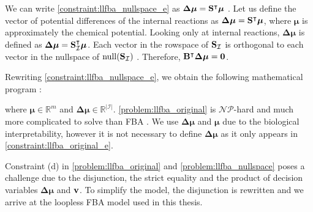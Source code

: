 We can write \cref{constraint:llfba_nullspace_e} as $\boldsymbol{\Delta \mu} = \bold S ^\intercal \boldsymbol \mu$ \cite{noor_proof_2012, elimination_infeasible_loops, muller_fast_2013}. Let us define the vector of potential differences of the internal reactions as $\boldsymbol{\Delta \mu} = \bold S ^\intercal \boldsymbol \mu$, where $\boldsymbol \mu$ is approximately the chemical potential. Looking only at internal reactions, $\boldsymbol{\Delta \mu}$ is defined as $\boldsymbol{\Delta \mu} = \bold S_\mathcal{I}^\intercal \boldsymbol \mu$.  
Each vector in the rowspace of $\bold S_{\mathcal{I}}$ is orthogonal to each vector in the nullspace of $\mathrm{null}(\bold S_{\mathcal{I}})$ \cite{noor_proof_2012}.
Therefore, $\bold B^\intercal \boldsymbol{\Delta \mu} = \bold 0$. 

Rewriting \cref{constraint:llfba_nullspace_e}, we obtain the following mathematical program \cite{muller_fast_2013}:
where $\boldsymbol \mu \in \mathbb{R}^m$ and $\boldsymbol{\Delta \mu} \in \mathbb{R}^{|\mathcal{I}|}$. 
\cref{problem:llfba_original} is $\mathcal{NP}$-hard and much more complicated to solve than \textsf{FBA} \cite{cornelis_metabolic_nodate}. We use $\boldsymbol{\Delta \mu}$ and $\boldsymbol \mu$ due to the biological interpretability, however it is not necessary to define $\boldsymbol{\Delta \mu}$ as it only appears in \cref{constraint:llfba_original_e}.

Constraint (d) in \cref{problem:llfba_original} and \cref{problem:llfba_nullspace} poses a challenge due to the disjunction, the strict equality and the product of decision variables $\boldsymbol{\Delta \mu}$ and $\bold v$. To simplify the model, the disjunction is rewritten and we arrive at the loopless FBA model used in this thesis.

